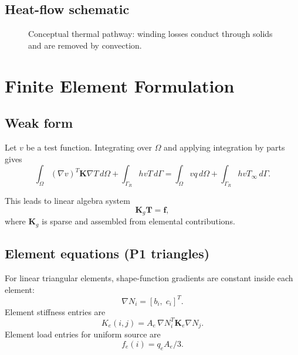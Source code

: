 \documentclass[11pt,a4paper]{article}
\begin{document}
\subsection{Heat-flow schematic}
\begin{figure}[h!]
\centering
{}
\caption{Conceptual thermal pathway: winding losses conduct through solids and are removed by convection.}
\label{fig:heat-schematic}
\end{figure}

\clearpage
\section{Finite Element Formulation}
\subsection{Weak form}
Let \(v\) be a test function. Integrating over \(\Omega\) and applying integration by parts gives
\begin{equation}
\int_{\Omega} (\nabla v)^T\mathbf{K}\nabla T\,d\Omega
+ \int_{\Gamma_R} h v T\,d\Gamma
= \int_{\Omega} v q\,d\Omega + \int_{\Gamma_R} h v T_{\infty}\,d\Gamma.
\end{equation}

This leads to linear algebra system
\begin{equation}
\mathbf{K}_g\mathbf{T}=\mathbf{f},
\end{equation}
where \(\mathbf{K}_g\) is sparse and assembled from elemental contributions.

\subsection{Element equations (P1 triangles)}
For linear triangular elements, shape-function gradients are constant inside each element:
\begin{equation}
\nabla N_i = [b_i,\;c_i]^T.
\end{equation}
Element stiffness entries are
\begin{equation}
K_e(i,j)=A_e\,\nabla N_i^T\mathbf{K}_e\nabla N_j.
\end{equation}
Element load entries for uniform source are
\begin{equation}
f_e(i)=q_e A_e/3.
\end{equation}
\end{document}
